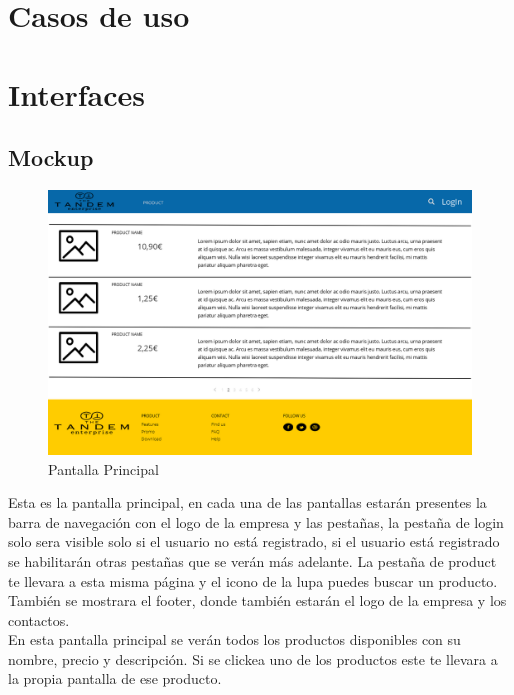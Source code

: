 \documentclass{article}
\begin{document}
\section{Casos de uso}
\begin{center}
\end{center}
\newpage
\section{Interfaces}
\subsection{Mockup}
\begin{figure}[h]
    \centering
    \includegraphics[scale=0.25]{mockup/Inicio.png}
    \caption{Pantalla Principal}
    \label{Fig:Inicio}
\end{figure}
\quad Esta es la pantalla principal, en cada una de las pantallas estarán presentes la barra de navegación con el logo de la empresa y las pestañas, la pestaña de login solo sera visible solo si el usuario no está registrado, si el usuario está registrado se habilitarán otras pestañas que se verán más adelante.
La pestaña de product te llevara a esta misma página y el icono de la lupa puedes buscar un producto.\\
También se mostrara el footer, donde también estarán el logo de la empresa y los contactos.\\
En esta pantalla principal se verán todos los productos disponibles con su nombre, precio y descripción. Si se clickea uno de los productos este te llevara a la propia pantalla de ese producto. 
\end{document}
